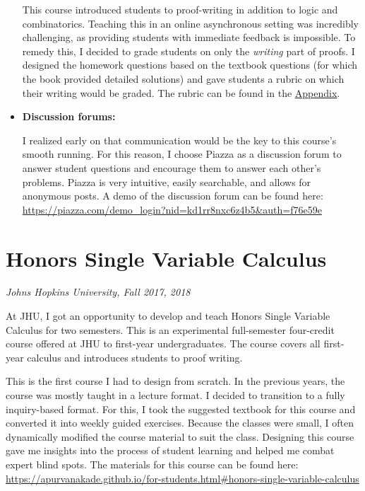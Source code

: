 \documentclass[
]{report}
\begin{document}
\begin{itemize}
  This course introduced students to proof-writing in addition to logic and combinatorics. Teaching this in an online asynchronous setting was incredibly challenging, as providing students with immediate feedback is impossible. To remedy this, I decided to grade students on only the \emph{writing} part of proofs.
  I designed the homework questions based on the textbook questions (for which the book provided detailed solutions) and gave students a rubric on which their writing would be graded. The rubric can be found in the \protect\hyperlink{sample-teaching-materials}{Appendix}.
\item
  \textbf{Discussion forums:}

  I realized early on that communication would be the key to this course's smooth running.
  For this reason, I choose Piazza as a discussion forum to answer student questions and encourage them to answer each other's problems.
  Piazza is very intuitive, easily searchable, and allows for anonymous posts.
  A demo of the discussion forum can be found here: \url{https://piazza.com/demo_login?nid=kd1rr8nxc6z4b5\&auth=f76e59e}
\end{itemize}

\hypertarget{honors-single-variable-calculus}{%
\section{Honors Single Variable Calculus}\label{honors-single-variable-calculus}}

\emph{Johns Hopkins University, Fall 2017, 2018}

At JHU, I got an opportunity to develop and teach Honors Single Variable Calculus for two semesters. This is an experimental full-semester four-credit course offered at JHU to first-year undergraduates. The course covers all first-year calculus and introduces students to proof writing.

This is the first course I had to design from scratch.
In the previous years, the course was mostly taught in a lecture format.
I decided to transition to a fully inquiry-based format.
For this, I took the suggested textbook for this course and converted it into weekly guided exercises.
Because the classes were small, I often dynamically modified the course material to suit the class.
Designing this course gave me insights into the process of student learning and helped me combat expert blind spots.
The materials for this course can be found here: \url{https://apurvanakade.github.io/for-students.html\#honors-single-variable-calculus}
\end{document}

